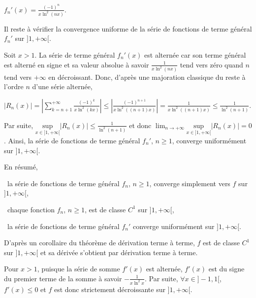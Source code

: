 {\begin{enumerate}
{\begin{center}
$f_n'(x) =\frac{(-1)^n}{x\ln^2(nx)}$.
\end{center}

Il reste à vérifier la convergence uniforme de la série de fonctions de terme général $f_n'$ sur $]1,+\infty[$.

Soit $x > 1$. La série de terme général $f_n'(x)$ est alternée car son terme général est alterné en signe et sa valeur absolue à savoir $\frac{1}{x\ln^2(nx)}$ tend vers zéro quand $n$ tend vers $+\infty$ en décroissant. Donc, d'après une majoration classique du reste à l'ordre $n$ d'une série alternée,

\begin{center}
$|R_n(x)|=\left|\sum_{k=n+1}^{+\infty}\frac{(-1)^k}{x\ln^2(kx)}\right|\leqslant\left|\frac{(-1)^{n+1}}{x\ln^2((n+1)x)}\right|=\frac{1}{x\ln^2((n+1)x)}\leqslant\frac{1}{\ln^2(n+1)}$.
\end{center}

Par suite, $\underset{x\in]1,+\infty[}{\text{sup}}|R_n(x)|\leqslant\frac{1}{\ln^2(n+1)}$ et donc $\lim_{n \rightarrow +\infty}\underset{x\in]1,+\infty[}{\text{sup}}|R_n(x)|=0$. Ainsi, la série de fonctions de terme général $f_n'$, $n\geqslant1$, converge uniformément sur $]1,+\infty[$.

En résumé,

\textbullet~la série de fonctions de terme général $f_n$, $n\geqslant1$, converge simplement vers $f$ sur $]1,+\infty[$,

\textbullet~chaque fonction $f_n$, $n\geqslant1$, est de classe $C^1$ sur $]1,+\infty[$,

\textbullet~la série de fonctions de terme général $f_n'$ converge uniformément sur $]1,+\infty[$.

D'après un corollaire du théorème de dérivation terme à terme, $f$ est de classe $C^1$ sur $]1,+\infty[$ et sa dérivée s'obtient par dérivation terme à terme. 

\begin{center}
\shadowbox{
$f$ est de classe $C^1$ sur $]1,+\infty[$ et $\forall x>1$, $f'(x) =\sum_{n=1}^{+\infty}\frac{(-1)^n}{x\ln^2(nx)}$.
}
\end{center}

Pour $x >1$, puisque la série de somme $f'(x)$ est alternée, $f'(x)$ est du signe du premier terme de la somme à savoir $-\frac{1}{x\ln^2x}$. Par suite, $\forall x\in]-1,1[$, $f'(x)\leqslant0$ et $f$ est donc strictement décroissante sur $]1,+\infty[$.

\begin{center}
\shadowbox{
La fonction $f$ est décroissante sur $]1,+\infty[$.
}
\end{center}}
\end{enumerate}
}
